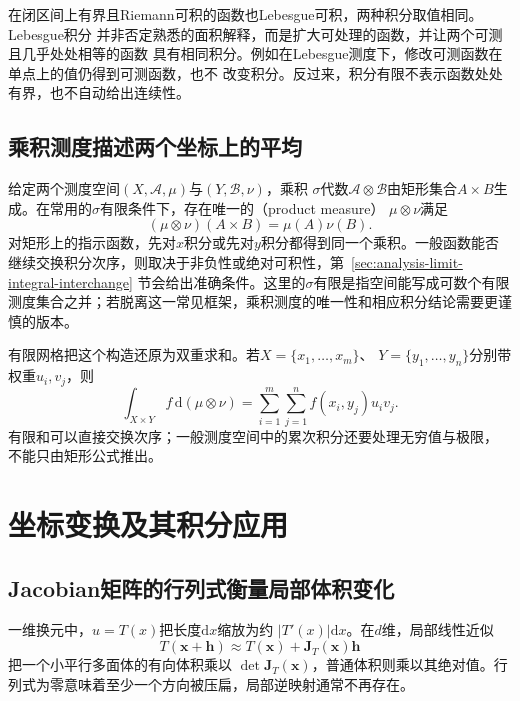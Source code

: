 在闭区间上有界且Riemann可积的函数也Lebesgue可积，两种积分取值相同。Lebesgue积分
并非否定熟悉的面积解释，而是扩大可处理的函数，并让两个可测且几乎处处相等的函数
具有相同积分。例如在Lebesgue测度下，修改可测函数在单点上的值仍得到可测函数，也不
改变积分。反过来，积分有限不表示函数处处有界，也不自动给出连续性。
\subsection{乘积测度描述两个坐标上的平均}

给定两个测度空间$(X,\mathcal{A},\mu)$与$(Y,\mathcal{B},\nu)$，乘积 $\sigma$代数$\mathcal{A}\otimes\mathcal{B}$由矩形集合$A\times B$生成。在常用的$\sigma$有限条件下，存在唯一的（product measure） $\mu\otimes\nu$满足
\[   (\mu\otimes\nu)(A\times B)=\mu(A)\nu(B). \]
对矩形上的指示函数，先对$x$积分或先对$y$积分都得到同一个乘积。一般函数能否继续交换积分次序，则取决于非负性或绝对可积性，第~\ref{sec:analysis-limit-integral-interchange}
节会给出准确条件。这里的$\sigma$有限是指空间能写成可数个有限测度集合之并；若脱离这一常见框架，乘积测度的唯一性和相应积分结论需要更谨慎的版本。

有限网格把这个构造还原为双重求和。若$X=\{x_1,\ldots,x_m\}$、
$Y=\{y_1,\ldots,y_n\}$分别带权重$u_i,v_j$，则
\[
  \int_{X\times Y}f\,\mathrm{d}(\mu\otimes\nu)
  =
  \sum_{i=1}^m\sum_{j=1}^n f(x_i,y_j)u_iv_j.
\]
有限和可以直接交换次序；一般测度空间中的累次积分还要处理无穷值与极限，
不能只由矩形公式推出。
\section{坐标变换及其积分应用}
\label{sec:analysis-coordinate-change-integral-applications}
\subsection{Jacobian矩阵的行列式衡量局部体积变化}

一维换元中，$u=T(x)$把长度$\mathrm{d}x$缩放为约 $|T'(x)|\mathrm{d}x$。在$d$维，局部线性近似
\[   T(\bm{x}+\bm{h})   \approx   T(\bm{x})+\bm{J}_T(\bm{x})\bm{h} \]
把一个小平行多面体的有向体积乘以 $\det\bm{J}_T(\bm{x})$，普通体积则乘以其绝对值。行列式为零意味着至少一个方向被压扁，局部逆映射通常不再存在。

